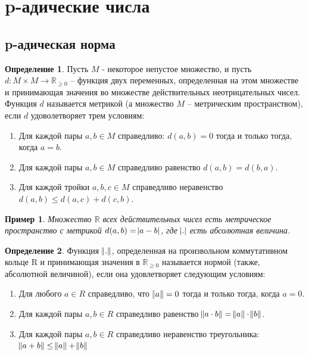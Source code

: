 \documentclass[master, och, diploma, times]{sty/SCWorks}
\theoremstyle{plain}
\newtheorem{exmp}{Пример}[section]
\theoremstyle{definition}
\newtheorem{defn}{Определение}[section]
\begin{document}
\section{p-адические числа}

\subsection{p-адическая норма}

\begin{defn}
Пусть $M$ - некоторое непустое множество, и пусть \linebreak ${d: M \times M \rightarrow \mathbb {R}_{\ge0}}$ -- функция двух переменных, определенная на этом множестве и принимающая значения во множестве действительных неотрицательных чисел. Функция $d$ называется метрикой (а множество $M$ -- метрическим пространством), если $d$ удоволетворяет трем условиям:

\begin{enumerate} 
	\item Для каждой пары $a, b \in M$ справедливо: $d(a, b)=0$ тогда и только тогда, когда $a=b$.
	\item Для каждой пары $a, b \in M$ справедливо равенство $d(a, b) = d(b, a)$.
	\item Для каждой тройки $a, b, c \in M$ справедливо неравенство $d(a, b) \le d(a, c) + d(c, b)$.
\end{enumerate}
\end{defn}

\begin{exmp}
Множество $\mathbb {R}$ всех действительных чисел есть метрическое пространство с метрикой $d(a, b)= \abs{a-b}$, где $\abs{.}$ есть абсолютная величина.
\end{exmp}


\begin{defn}
Функция $\norm{.}$, определенная на произвольном коммутативном кольце R и принимающая значения в $\mathbb {R}_{\ge 0}$ называется нормой (также, абсолютной величиной), если она удовлетворяет следующим условиям:

\begin{enumerate} 
	\item Для любого $a \in R$ справедливо, что $\norm{a}=0$ тогда и только тогда, когда $a=0$.
	\item Для каждой пары $a, b \in R$ справедливо равенство $\norm{a \cdot b} = \norm{a} \cdot \norm{b}$.
	\item Для каждой пары $a, b \in R$ справедливо неравенство треугольника: $\norm{a + b} \le \norm{a} + \norm{b}$
\end{enumerate}
\end{defn}
\end{document}
